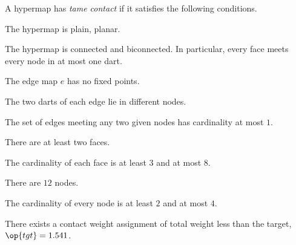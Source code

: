 A hypermap has {\it tame contact\/} if it satisfies the following
conditions.
%
%
%
%
%
%
%
%
%
\begin{nomerate}
\item {} The hypermap is plain, planar.
\item {} The hypermap is connected and biconnected.
  In particular, every face meets every node in at most one dart.
\item {} The edge map $e$ has no fixed points.
\item {} The two darts of each edge lie in different nodes.
\item {} The set of edges meeting any two given
  nodes has cardinality at most $1$.
\item {}
\item {} There are at least two faces.
\item {} The cardinality of each face is at least $3$
  and at most $8$.
\item {} There are $12$ nodes.
\item {} The cardinality of every node is at least $2$
  and at most $4$.
\item {} There exists a contact weight assignment
of total weight less than the target, $\op{tgt}=1.541$.
\end{nomerate}
%

